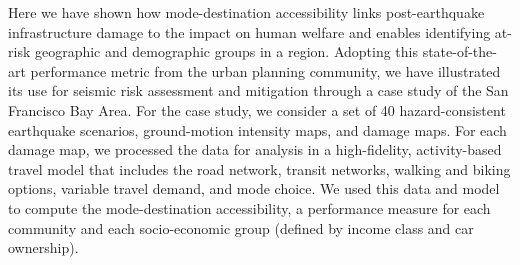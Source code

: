 Here we have shown how mode-destination accessibility links post-earthquake infrastructure damage to the impact on human welfare and enables identifying at-risk geographic and demographic groups in a region. 
Adopting this state-of-the-art performance metric from the urban planning community, we have illustrated its use for seismic risk assessment and mitigation through a case study of the San Francisco Bay Area. For the case study, we consider a set of 40 hazard-consistent earthquake scenarios, ground-motion intensity maps, and damage maps. For each damage map, we processed the data for analysis in a high-fidelity, activity-based travel model that includes the road network, transit networks, walking and biking options, variable travel demand, and mode choice. We used this data and model to compute the mode-destination accessibility, a performance measure for each community and each socio-economic group (defined by income class and car ownership). 


%

